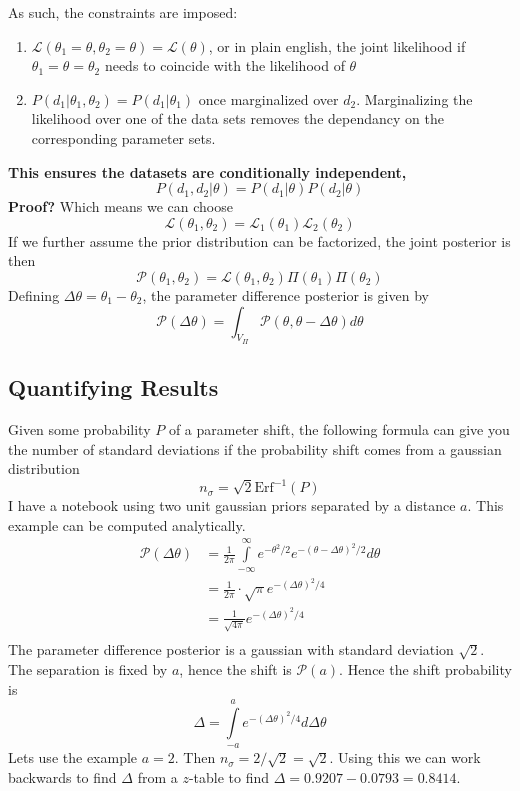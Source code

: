 As such, the constraints are imposed:
\begin{enumerate}
    \item $\mathcal{L}(\theta_1=\theta,\theta_2=\theta) = \mathcal{L}(\theta)$, or in plain english, the joint likelihood if $\theta_1=\theta=\theta_2$ needs to coincide with the likelihood of $\theta$
    \item $P(d_1|\theta_1,\theta_2)=P(d_1|\theta_1)$ once marginalized over $d_2$. Marginalizing the likelihood over one of the data sets removes the dependancy on the corresponding parameter sets.
\end{enumerate}
 \textbf{This ensures the datasets are conditionally independent,}
    $$ P(d_1,d_2|\theta) = P(d_1|\theta)P(d_2|\theta)$$
\textbf{Proof?}
Which means we can choose $$\mathcal{L}(\theta_1,\theta_2) = \mathcal{L}_1(\theta_1)\mathcal{L}_2(\theta_2)$$
If we further assume the prior distribution can be factorized, the joint posterior is then
$$ \mathcal{P}(\theta_1,\theta_2) = \mathcal{L}(\theta_1,\theta_2)\Pi(\theta_1)\Pi(\theta_2) $$
Defining $\Delta\theta = \theta_1-\theta_2$, the parameter difference posterior is given by
\[ \mathcal{P}(\Delta\theta) = \int_{V_\Pi} \mathcal{P}(\theta,\theta-\Delta\theta)d\theta\]

\subsection{Quantifying Results}

Given some probability $P$ of a parameter shift, the following formula can give you the number of standard deviations if the probability shift comes from a gaussian distribution
\[ n_\sigma = \sqrt{2} \text{Erf}^{-1}(P) \]
I have a notebook using two unit gaussian priors separated by a distance $a$. This example can be computed analytically.
\begin{equation*}
    \begin{split}
	\mathcal{P}(\Delta \theta) &= \frac{1}{2\pi} \int\limits_{-\infty}^{\infty} e^{-\theta^2/2} e^{-(\theta-\Delta\theta)^2/2}  d\theta \\
				   &= \frac{1}{2\pi} \cdot \sqrt{\pi} e^{-(\Delta\theta)^2/4}\\
				   &= \frac{1}{\sqrt{4\pi}}e^{-(\Delta\theta)^2/4}\\
    \end{split}
\end{equation*}
The parameter difference posterior is a gaussian with standard deviation $\sqrt{2}$. The separation is fixed by $a$, hence the shift is $\mathcal{P}(a)$. Hence the shift probability is
\[ \Delta = \int\limits_{-a}^{a} e^{-(\Delta\theta)^2/4} d\Delta\theta \]
Lets use the example $a=2$. Then $n_\sigma = 2/\sqrt{2} = \sqrt{2}$. Using this we can work backwards to find $\Delta$ from a $z$-table to find $\Delta = 0.9207 - 0.0793 = 0.8414 $. 
